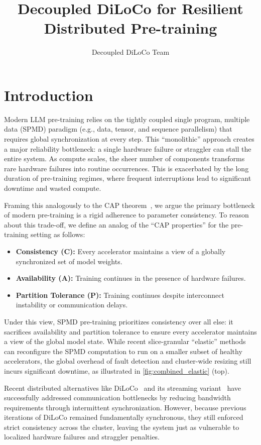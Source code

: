 \documentclass[11pt, a4paper, twocolumn, copyright, google]{google}
\title{\LARGE Decoupled DiLoCo for Resilient Distributed Pre-training%
}
\author[1,2]{Decoupled DiLoCo Team}
\affil[1]{Google DeepMind}
\affil[2]{Google Research}
\begin{document}
\maketitle

\section{Introduction}\label{sec:intro}

Modern LLM pre-training relies on the tightly coupled single program, multiple data (SPMD) paradigm (e.g., data, tensor, and sequence parallelism) that requires global synchronization at every step. This ``monolithic'' approach creates a major reliability bottleneck: a single hardware failure or straggler can stall the entire system. As compute scales, the sheer number of components transforms rare hardware failures into routine occurrences. This is exacerbated by the long duration of pre-training regimes, where frequent interruptions lead to significant downtime and wasted compute.

Framing this analogously to the CAP theorem~\citep{brewer2000towards}, we argue the primary bottleneck of modern pre-training is a rigid adherence to parameter consistency. To reason about this trade-off, we define an analog of the ``CAP properties'' for the pre-training setting as follows:
%
\begin{itemize}[leftmargin=5pt, nosep]
    \item \textbf{Consistency (C):} Every accelerator maintains a view of a globally synchronized set of model weights.
    \item \textbf{Availability (A):} Training continues in the presence of hardware failures.
    \item \textbf{Partition Tolerance (P):} Training continues despite interconnect instability or communication delays.
\end{itemize}
%
Under this view, SPMD pre-training prioritizes consistency over all else: it sacrifices availability and partition tolerance to ensure every accelerator maintains a view of the global model state. While recent slice-granular ``elastic'' methods \citep{geminiteam2025gemini2p5} can reconfigure the SPMD computation to run on a smaller subset of healthy accelerators, the global overhead of fault detection and cluster-wide resizing still incurs significant downtime, as illustrated in \autoref{fig:combined_elastic} (top).

Recent distributed alternatives like DiLoCo~\citep{douillard2024diloco} and its streaming variant~\citep{douillard2025streaming} have successfully addressed communication bottlenecks by reducing bandwidth requirements through intermittent synchronization. However, because previous iterations of DiLoCo remained fundamentally synchronous, they still enforced strict consistency across the cluster, leaving the system just as vulnerable to localized hardware failures and straggler penalties.
\end{document}
